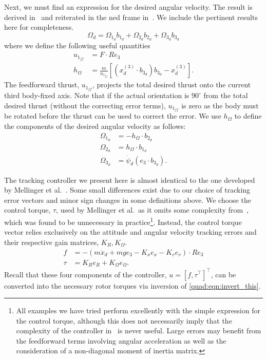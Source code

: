 Next, we must find an expression for the desired angular velocity. The result is derived in~\cite{Mellinger2011} and reiterated in the \gls{ned} frame in~\cite{Allen2016}. We include the pertinent results here for completeness.
\begin{equation}
    \Omega_d = \Omega_{1_d} b_{1_d} + \Omega_{2_d} b_{2_d} + \Omega_{3_d} b_{3_d}
\end{equation}
where we define the following useful quantities
\begin{align}
    u_{1_{ff}} &= F \cdot Re_3 \\
    h_\Omega &= \frac{m}{u_{1_{ff}}} [(x_d^{(3)} \cdot b_{3_d})b_{3_d} - x_d^{(3)}].
\end{align}
The feedforward thrust, $u_{1_{ff}}$, projects the total desired thrust onto the current third body-fixed axis. Note that if the actual orientation is $90^\circ$ from the total desired thrust (without the correcting error terms), $u_{1_{ff}}$ is zero as the body must be rotated before the thrust can be used to correct the error. We use $h_\Omega$ to define the components of the desired angular velocity as follows:
\begin{equation}
    \begin{aligned}
        \Omega_{1_d} &= -h_\Omega \cdot b_{2_d} \\
        \Omega_{2_d} &= h_\Omega \cdot b_{1_d} \\
        \Omega_{3_d} &= \dot{\psi}_d (e_3 \cdot b_{3_d}).
    \end{aligned}
\end{equation}

The tracking controller we present here is almost identical to the one developed by Mellinger et al.~\cite{Mellinger2011}. Some small differences exist due to our choice of tracking error vectors and minor sign changes in some definitions above. We choose the control torque, $\tau$, used by Mellinger et al.\ as it omits some complexity from~\cite{Lee2010}, which was found to be unnecessary in practice\footnote{All examples we have tried perform excellently with the simple expression for the control torque, although this does not necessarily imply that the complexity of the controller in~\cite{Lee2010} is never useful. Large errors may benefit from the feedforward terms involving angular acceleration as well as the consideration of a non-diagonal moment of inertia matrix.}. Instead, the control torque vector relies exclusively on the attitude and angular velocity tracking errors and their respective gain matrices, $K_R, K_\Omega$.
\begin{align}
    f &= -(m\ddot{x}_d + mge_3 - K_x e_x - K_v e_v) \cdot Re_3\\
    \tau &= K_R e_R + K_\Omega e_\Omega.
\label{quad:eqn:control_law}
\end{align}
Recall that these four components of the controller, $u={[f, \tau^\top]}^\top$, can be converted into the necessary rotor torques via inversion of \autoref{quad:eqn:invert_this}.

